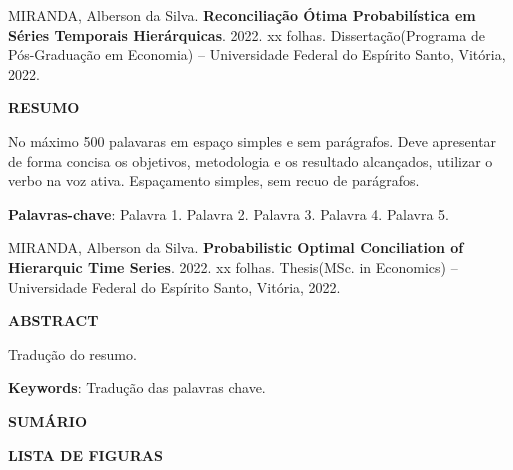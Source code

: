 \documentclass[
  12pt,
  letterpaper,
  DIV=11,
  numbers=noendperiod]{scrartcl}
\newcommand{\nome}{Alberson da Silva}
\newcommand{\sobrenome}{Miranda}
\newcommand{\tipo}{Dissertação}
\newcommand{\tipoingles}{Thesis}
\newcommand{\titulo}{Reconciliação Ótima Probabilística em Séries Temporais Hierárquicas}
\newcommand{\tituloingles}{Probabilistic Optimal Conciliation of Hierarquic Time Series}
\newcommand{\universidade}{Universidade Federal do Espírito Santo}
\newcommand{\curso}{Programa de Pós-Graduação em Economia}
\newcommand{\cursoingles}{MSc. in Economics}
\newcommand{\cidade}{Vitória}
\newcommand{\ano}{2022}
\begin{document}
\newpage
\thispagestyle{empty}
\begin{singlespace}
\noindent \MakeUppercase{\sobrenome}, \nome. \textbf{\titulo}. \ano. xx folhas. \tipo\>(\curso) -- \universidade, \cidade, \ano.

\vspace{1pc}
\begin{center}
\textbf{RESUMO}
\end{center}
\vspace{1pc}

\noindent
No máximo 500 palavaras em espaço simples e sem parágrafos. Deve apresentar de forma concisa os objetivos, metodologia e os resultado alcançados, utilizar o verbo na voz ativa. Espaçamento simples, sem recuo de parágrafos.

\vspace{2pc}
\noindent
{\textbf{Palavras-chave}:}  Palavra 1. Palavra 2. Palavra 3. Palavra 4. Palavra 5.

\end{singlespace}

\newpage
\thispagestyle{empty}

\begin{singlespace}
\noindent \MakeUppercase{\sobrenome}, \nome. \textbf{\tituloingles}. \ano. xx folhas. \tipoingles\>(\cursoingles) -- \universidade, \cidade, \ano.

\vspace{1pc}
\begin{center}
\textbf{ABSTRACT}
\end{center}
\vspace{1pc}

\noindent 
Tradução do resumo.

\vspace{2pc}
\noindent
{\textbf{Keywords}:}  Tradução das palavras chave.
\end{singlespace}

\newpage
\thispagestyle{empty}
\begin{flushleft}
\begingroup
\let\clearpage\relax

\newpage
\begin{center}
\MakeUppercase{\textbf{Sumário}}
\end{center}
\begin{center}
\tableofcontents
\end{center}
\end{flushleft}

\newpage
\thispagestyle{empty}
\begin{center}
\MakeUppercase{\textbf{LISTA DE FIGURAS}}
\end{center}
\listoffigures
\end{document}
